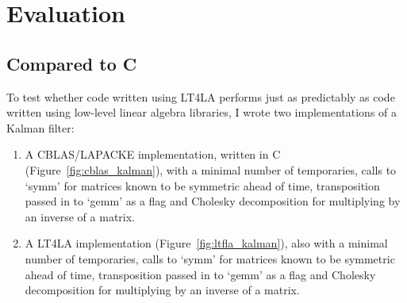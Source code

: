 \chapter{Evaluation}\label{chap:eval}



%

\section{Compared to C}

To test whether code written using LT4LA performs just as predictably as code
written using low-level linear algebra libraries, I wrote two implementations
of a Kalman filter:

\begin{enumerate}

    \item A CBLAS/LAPACKE implementation, written in C
        (Figure~\ref{fig:cblas_kalman}), with a minimal number of temporaries,
        calls to `symm' for matrices known to be symmetric ahead of time,
        transposition passed in to `gemm' as a flag and Cholesky decomposition
        for multiplying by an inverse of a matrix.

    \item A LT4LA implementation (Figure~\ref{fig:ltfla_kalman}), also with a
        minimal number of temporaries, calls to `symm' for matrices known to be
        symmetric ahead of time, transposition passed in to `gemm' as a flag
        and Cholesky decomposition for multiplying by an inverse of a matrix.

\end{enumerate}

